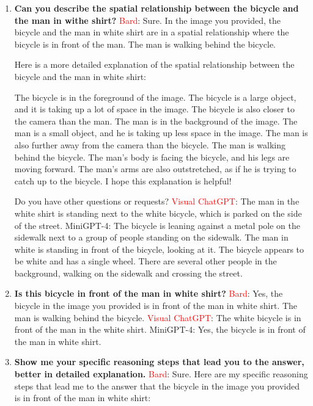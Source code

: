 \begin{enumerate}
    \item \textbf{Can you describe the spatial relationship between the bicycle and the man in withe shirt?}
    \subitem \textcolor{Red}{Bard}: Sure. In the image you provided, the bicycle and the man in white shirt are in a spatial relationship where the bicycle is in front of the man. The man is walking behind the bicycle.

    Here is a more detailed explanation of the spatial relationship between the bicycle and the man in white shirt:
    
    The bicycle is in the foreground of the image. The bicycle is a large object, and it is taking up a lot of space in the image. The bicycle is also closer to the camera than the man.
    The man is in the background of the image. The man is a small object, and he is taking up less space in the image. The man is also further away from the camera than the bicycle.
    The man is walking behind the bicycle. The man's body is facing the bicycle, and his legs are moving forward. The man's arms are also outstretched, as if he is trying to catch up to the bicycle.
    I hope this explanation is helpful!
    
    Do you have other questions or requests?
    \subitem \textcolor{red}{Visual ChatGPT}: The man in the white shirt is standing next to the white bicycle, which is parked on the side of the street.
    \subitem MiniGPT-4: The bicycle is leaning against a metal pole on the sidewalk next to a group of people standing on the sidewalk. The man in white is standing in front of the bicycle, looking at it. The bicycle appears to be white and has a single wheel. There are several other people in the background, walking on the sidewalk and crossing the street.
    \item \textbf{Is this bicycle in front of the man in white shirt?}
    \subitem \textcolor{Red}{Bard}: 
    Yes, the bicycle in the image you provided is in front of the man in white shirt. The man is walking behind the bicycle. 
    \subitem \textcolor{red}{Visual ChatGPT}: The white bicycle is in front of the man in the white shirt.
    \subitem MiniGPT-4: Yes, the bicycle is in front of the man in white shirt.
    \item \textbf{Show me your specific reasoning steps that lead you to the answer, better in detailed explanation.}
    \subitem \textcolor{Red}{Bard}: 
    Sure. Here are my specific reasoning steps that lead me to the answer that the bicycle in the image you provided is in front of the man in white shirt:


\end{enumerate}
